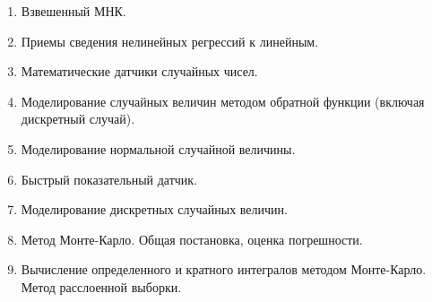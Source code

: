 \documentclass[12pt]{article}
\begin{document}
\begin{enumerate}
    \item Взвешенный МНК.
    \item Приемы сведения нелинейных регрессий к линейным.
    \item Математические датчики случайных чисел.
    \item Моделирование случайных величин методом обратной функции (включая дискретный случай).
    \item Моделирование нормальной случайной величины.
    \item Быстрый показательный датчик.
    \item Моделирование дискретных случайных величин.
    \item Метод Монте-Карло. Общая постановка, оценка погрешности.
    \item Вычисление определенного и кратного интегралов методом Монте-Карло. Метод расслоенной выборки.
\end{enumerate}

\end{document}
